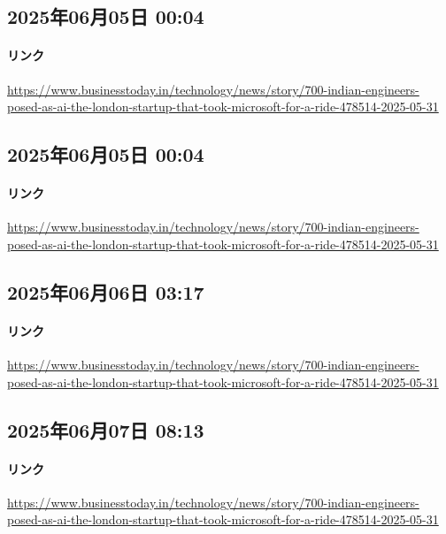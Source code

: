 \subsection*{2025年06月05日 00:04}

\paragraph{リンク}
\url{https://www.businesstoday.in/technology/news/story/700-indian-engineers-posed-as-ai-the-london-startup-that-took-microsoft-for-a-ride-478514-2025-05-31}

\subsection*{2025年06月05日 00:04}

\paragraph{リンク}
\url{https://www.businesstoday.in/technology/news/story/700-indian-engineers-posed-as-ai-the-london-startup-that-took-microsoft-for-a-ride-478514-2025-05-31}

\subsection*{2025年06月06日 03:17}

\paragraph{リンク}
\url{https://www.businesstoday.in/technology/news/story/700-indian-engineers-posed-as-ai-the-london-startup-that-took-microsoft-for-a-ride-478514-2025-05-31}

\subsection*{2025年06月07日 08:13}

\paragraph{リンク}
\url{https://www.businesstoday.in/technology/news/story/700-indian-engineers-posed-as-ai-the-london-startup-that-took-microsoft-for-a-ride-478514-2025-05-31}

